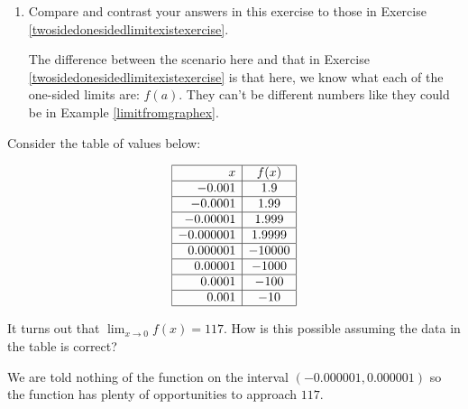\documentclass{ximera}
\begin{document}
\begin{problem}
\begin{enumerate}
\begin{solution}
If $f$ is continuous at $x=a$, then $\lim_{x \rightarrow a} f(x) = f(a)$.  This means  $\lim_{x \rightarrow a^{-}} f(x) = f(a)$ and  $\lim_{x \rightarrow a^{+}} f(x) = f(a)$, so $f$ is continuous from both directions at $x=a$. The converse is also true since if $\lim_{x \rightarrow a^{-}} f(x) = f(a)$ and  $\lim_{x \rightarrow a^{+}} f(x) = f(a)$, then $\lim_{x \rightarrow a} f(x) = f(a)$.

\end{solution}

\item  Compare and contrast your answers in this exercise to those in Exercise \ref{twosidedonesidedlimitexistexercise}.

\begin{solution}
The difference between the scenario here and that in Exercise \ref{twosidedonesidedlimitexistexercise} is that here, we know what each of the one-sided limits are: $f(a)$. They can't be different numbers like they could be in  Example \ref{limitfromgraphex}.
\end{solution}
\end{enumerate}

\end{problem}

\begin{problem}
Consider the table of values below:

\[ \begin{array}{|r|c|}  \hline
x & f(x)  \\    \hline 
-0.001  &  1.9 \\   \hline 
-0.0001 & 1.99 \\   \hline
-0.00001 & 1.999\\   \hline
-0.000001 & 1.9999 \\  \hline
0.000001 & -10000\\   \hline
0.00001 & -1000 \\  \hline
0.0001 & - 100 \\   \hline
0.001 & -10 \\  \hline
\end{array} \]

It turns out that $\lim_{x \rightarrow 0} f(x) = 117$.  How is this possible assuming the data in the table is correct?

\begin{solution}
We are told nothing of the function on the interval $(-0.000001, 0.000001 )$ so the function has plenty of opportunities to approach $117$. 
\end{solution}

\end{problem}
\end{document}

